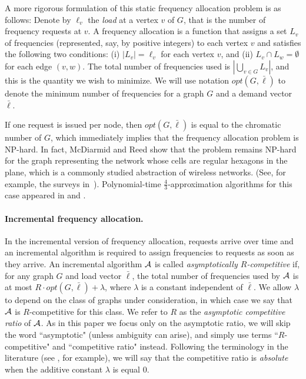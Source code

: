 \documentclass[11pt]{article}
\newcommand{\calA}{{\cal A}}
\newcommand{\barell}{{\bar\ell}}
\newcommand{\fourthirds}{{\mbox{$\frac{4}{3}$}}}
\newcommand{\opt}{{\textit{opt}}}
\newcommand{\NP}{{\textsf{NP}}}
\begin{document}
A more rigorous formulation of this static frequency allocation problem is
as follows: Denote by $\ell_v$ the \emph{load} at a vertex $v$ of $G$, that is
the number of frequency requests at $v$. A frequency allocation is
a function that assigns a set $L_v$ of frequencies (represented, say, by
positive integers) to each vertex $v$
and satisfies the following two conditions: 
(i) $|L_v| = \ell_v$ for each vertex $v$, and
(ii) $L_v\cap L_w = \emptyset$ for each edge $(v,w)$.
The total number of frequencies used is $|\bigcup_{v\in G} L_v|$, and this
is the quantity we wish to minimize. We will use notation
$\opt(G,\barell)$ to denote the minimum number of frequencies 
for a graph $G$ and a demand vector $\barell$.

If one request is issued per node, then $\opt(G,\barell)$ is equal to the
chromatic number of $G$, which immediately implies that the frequency
allocation problem is {\NP}-hard. In fact,
McDiarmid and Reed \cite{McDRee00} show that the problem remains {\NP}-hard
for the graph representing the network whose cells are regular
hexagons in the plane, which is a commonly studied abstraction of
wireless networks. (See, for example,
the surveys in~\cite{Murthy-etal99,Aardal-etal03}).
Polynomial-time $\fourthirds$-approximation algorithms for this
case appeared in \cite{McDRee00} and \cite{NarShe01}.



\paragraph{Incremental frequency allocation.}
In the incremental version of frequency allocation, requests arrive over time and 
an incremental algorithm is required to assign frequencies to requests
as soon as they arrive. An incremental algorithm $\calA$ is called
\emph{asymptotically $R$-competitive} if, for any graph $G$ and load vector $\barell$,
the total number of frequencies 
used by $\calA$ is at most $R\cdot \opt(G,\barell)+ \lambda$, where $\lambda$ is a constant
independent of $\barell$. We allow $\lambda$ to depend on the class of graphs under 
consideration, in which case we say that $\calA$ is $R$-competitive for this class.
We refer to $R$ as the \emph{asymptotic competitive ratio} of $\calA$. As in this paper
we focus only on the asymptotic ratio, we will skip the word
``asymptotic" (unless ambiguity can arise), and simply use
terms ``$R$-competitive" and ``competitive ratio" instead. Following
the terminology in the literature (see \cite{ChChYZ07,ChChYZ10}, for example),
we will say that the 
competitive ratio is \emph{absolute} when the additive constant
$\lambda$ is equal $0$.
\end{document}
